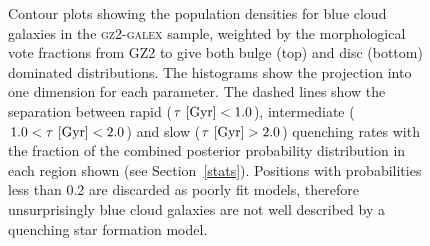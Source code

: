 \begin{figure}
\caption[Smooth and disc weighted opulation densities of blue cloud galaxies]{Contour plots showing the population densities for blue cloud galaxies in the \textsc{gz2-galex} sample, weighted by the morphological vote fractions from GZ2 to give both bulge (top) and disc (bottom) dominated distributions. The histograms show the projection into one dimension for each parameter. The dashed lines show the separation between rapid ($\tau ~\rm{[Gyr]} < 1.0$), intermediate ($1.0 < \tau ~\rm{[Gyr]} < 2.0$) and slow ($\tau ~\rm{[Gyr]} > 2.0$) quenching rates with the fraction of the combined posterior probability distribution in each region shown (see Section~\ref{stats}). Positions with probabilities less than 0.2 are discarded as poorly fit models, therefore unsurprisingly blue cloud galaxies are not well described by a quenching star formation model. }
\label{blue_c}
\end{figure}

